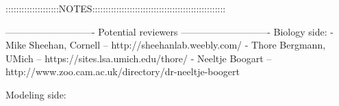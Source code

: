 ::::::::::::::::::::NOTES::::::::::::::::::::::::::::::::::::::::::::::::::

----------------------------
Potential reviewers
----------------------------
Biology side:
- Mike Sheehan, Cornell -- http://sheehanlab.weebly.com/
- Thore Bergmann, UMich -- https://sites.lsa.umich.edu/thore/
- Neeltje Boogart -- http://www.zoo.cam.ac.uk/directory/dr-neeltje-boogert

Modeling side:





